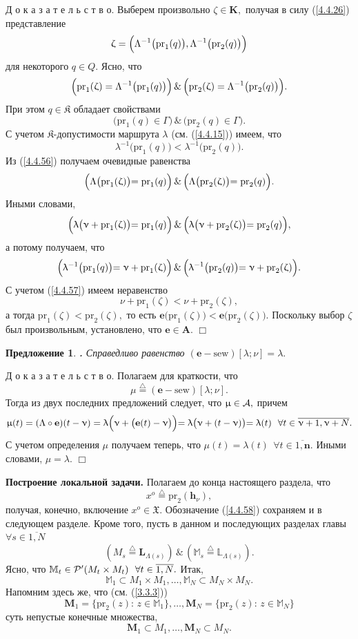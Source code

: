 \documentclass[11pt,twoside,openany]{report}
\newcommand{\bfn}{\begin{equation}}
\newcommand{\efn}{\end{equation}}
\newcommand{\df}{\stackrel{\triangle}{=}}
\newcommand{\ov}{\overline}
\newcounter{theo}
\newcounter{pred}
\newtheorem{pred}{Предложение}[section]
\newcommand{\TL}{\mbox{\bf{$\!\!$.}}}
\newcommand{\La}{\Lambda}
\newcommand{\la}{\lambda}
\newcommand{\fa}{\forall}
\newcommand{\cp}{{\cal P}}
\newcommand{\ca}{{\cal A}}
\newcommand{\bbl}{{\mathbb L}}
\newcommand{\bbm}{{\mathbb M}}
\begin{document}
{Д о к а з а т е л ь с т в о. Выберем произвольно $\zeta \in \mathbf{K},$
получая в силу (\ref{4.4.26})  представление
$$\zeta = \Bigl(\La^{-1}\bigl(\mathrm{pr}_1(q)\bigl), \La^{-1}\bigl(\mathrm{pr}_2(q)\bigl)\Bigl)
$$
для некоторого $q\in Q.$ Ясно, что
\bfn\label{4.4.56}\Bigl(\mathrm{pr}_1(\zeta) = \La^{-1}\bigl(\mathrm{pr}_1(q)\bigl)\Bigl)\,\&\,
\Bigl(\mathrm{pr}_2(\zeta) = \La^{-1}\bigl(\mathrm{pr}_2(q)\bigl)\Bigl).
\efn
При этом $q\in \mathfrak{K}$ обладает свойствами
$$\bigl(\mathrm{pr}_1(q) \in \Gamma\bigl) \,\&\,\bigl(\mathrm{pr}_2(q) \in \Gamma\bigl).
$$
С учетом  $\mathfrak{K}$-допустимости маршрута $\la$ (см. (\ref{4.4.15})) имеем, что
\bfn\label{4.4.57}\la^{-1}\bigl(\mathrm{pr}_1(q)\bigl) < \la^{-1}\bigl(\mathrm{pr}_2(q)\bigl).
\efn
Из (\ref{4.4.56}) получаем очевидные равенства
$$\Bigl(\La\bigl(\mathrm{pr}_1(\zeta)\bigl) = \mathrm{pr}_1(q)\Bigl)\,\&\,
\Bigl(\La\bigl(\mathrm{pr}_2(\zeta)\bigl) = \mathrm{pr}_2(q)\Bigl).
$$
Иными словами,
$$\Bigl(\la\bigl(\nu + \mathrm{pr}_1(\zeta)\bigl) = \mathrm{pr}_1(q)\Bigl)\,\&\,
\Bigl(\la\bigl(\nu + \mathrm{pr}_2(\zeta)\bigl) = \mathrm{pr}_2(q)\Bigl),
$$
а потому получаем, что
$$\Bigl(\la^{-1}\bigl(\mathrm{pr}_1(q)\bigl) = \nu +\mathrm{pr}_1(\zeta)\Bigl)\,\&\,
\Bigl(\la^{-1}\bigl(\mathrm{pr}_2(q)\bigl) = \nu +\mathrm{pr}_2(\zeta)\Bigl).
$$
С учетом  (\ref{4.4.57}) имеем неравенство
$$\nu +\mathrm{pr}_1(\zeta) < \nu +\mathrm{pr}_2(\zeta),
$$
а тогда $\mathrm{pr}_1(\zeta) < \mathrm{pr}_2(\zeta),$ то есть $\mathbf{e}\bigl(\mathrm{pr}_1(\zeta)
\bigl) < \mathbf{e}\bigl(\mathrm{pr}_2(\zeta)\bigl).$ Поскольку выбор $\zeta$ был
произвольным, установлено, что $\mathbf{e}\in \mathbf{A}.$ \hfill $\Box$
\begin{pred}\label{p4.4.4}{\TL} Справедливо равенство $(\mathbf{e}- \mathrm{sew})[\la;\nu] = \la.$
\end{pred}

Д о к а з а т е л ь с т в о. Полагаем для краткости, что
$$\mu \df (\mathbf{e}- \mathrm{sew})[\la;\nu].
$$
Тогда из двух последних предложений следует, что $\mu \in \ca,$ причем
$$\mu(t) = (\La \circ \mathbf{e})(t -\nu) = \la\Bigl(\nu + \bigl(\mathbf{e}(t) - \nu\bigl)\Bigl) =
\la\bigl(\nu + (t-\nu)\bigl) = \la(t)\ \ \fa t\in \ov{\nu+1,\nu+N}.
$$
С учетом определения $\mu$ получаем теперь, что $\mu(t) = \la(t)\ \ \fa t\in \ov{1,\mathbf{n}}.$
Иными словами, $\mu = \la.$ \hfill $\Box$ \smallskip

{\bf Построение локальной задачи.} Полагаем до конца настоящего раздела, что
\bfn\label{4.4.58}x^o \df \mathrm{pr}_2(\mathbf{h}_\nu),
\efn
получая, конечно, включение $x^o\in \mathfrak{X}.$ Обозначение (\ref{4.4.58}) сохраняем и в
следующем разделе. Кроме  того, пусть в данном и последующих разделах главы $\fa s\in \ov{1,N}$
\bfn\label{4.4.59}(M_s \df \mathbf{L}_{\La(s)})\,\&\,(\bbm_s \df \bbl_{\La(s)}).
\efn
Ясно, что $\bbm_t\in \cp^\prime(M_t \times M_t)\ \ \fa t\in \ov{1,N}.$ Итак,
$$\bbm_1\subset M_1 \times M_1,\ldots,\bbm_N\subset M_N \times M_N.
$$
Напомним здесь же, что (см. (\ref{3.3.3}))
$$\mathbf{M}_1 = \{\mathrm{pr}_2(z):\,z\in \bbm_1\},\ldots,\mathbf{M}_N = \{\mathrm{pr}_2(z):\,z\in \bbm_N\}
$$
суть непустые конечные множества,
$$\mathbf{M}_1\subset M_1,\ldots,\mathbf{M}_N\subset M_N.
$$

}
\end{document}
